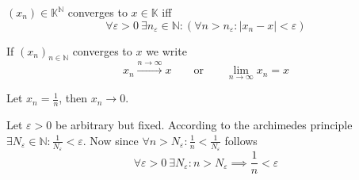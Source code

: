 \begin{definition}\label{def:conv_seq}
   \((x_n) \in \mathbb{K}^\mathbb{N}\) converges to \(x \in \mathbb{K}\) iff
   \[\forall \varepsilon > 0~\exists n_\varepsilon \in \mathbb{N}: (\forall n > n_\varepsilon: |x_n - x| < \varepsilon)\]
\end{definition}
\begin{remark}[Notation]
   If \((x_n)_{n \in \mathbb{N}}\) converges to \(x\) we write
   \[x_n \xrightarrow{n \to \infty} x \qquad\text{or}\qquad \lim_{n \to \infty} x_n = x\]
\end{remark}
\begin{example}
   Let \(x_n = \frac{1}{n}\), then \(x_n \to 0\).

   Let \(\varepsilon > 0\) be arbitrary but fixed.
   According to the archimedes principle \(\exists N_\varepsilon \in \mathbb{N}: \frac{1}{N_\varepsilon} < \varepsilon\).
   Now since \(\forall n > N_\varepsilon: \frac{1}{n} < \frac{1}{N_\varepsilon}\) follows
   \[\forall \varepsilon > 0~\exists N_\varepsilon: n > N_\varepsilon \implies \frac{1}{n} < \varepsilon\]

   \begin{center}
      
   \end{center}
\end{example}


